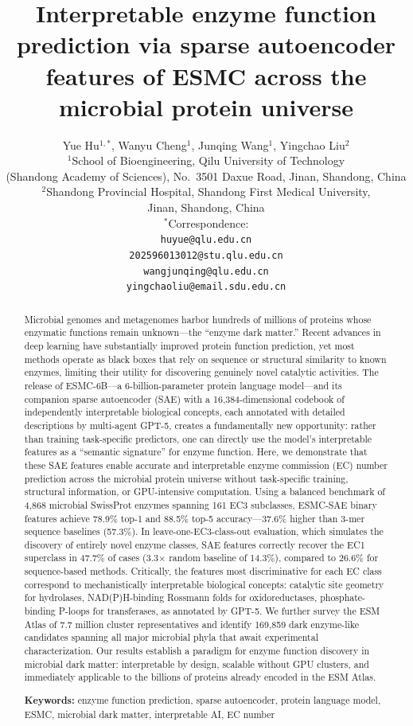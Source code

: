 \documentclass[12pt,a4paper]{article}
\title{\textbf{Interpretable enzyme function prediction via sparse autoencoder features of ESMC across the microbial protein universe}}
\author{
  \large
  Yue Hu$^{1,\ast}$, Wanyu Cheng$^{1}$, Junqing Wang$^{1}$, Yingchao Liu$^{2}$\\[6pt]
  \small
  $^{1}$School of Bioengineering, Qilu University of Technology\\
  \hspace*{1.2em}(Shandong Academy of Sciences), No.\ 3501 Daxue Road, Jinan, Shandong, China\\[4pt]
  $^{2}$Shandong Provincial Hospital, Shandong First Medical University,\\
  \hspace*{1.2em}Jinan, Shandong, China\\[8pt]
  $^{\ast}$Correspondence:\\
  \hspace*{1.2em}\texttt{huyue@qlu.edu.cn}\\
  \hspace*{1.2em}\texttt{202596013012@stu.qlu.edu.cn}\\
  \hspace*{1.2em}\texttt{wangjunqing@qlu.edu.cn}\\
  \hspace*{1.2em}\texttt{yingchaoliu@email.sdu.edu.cn}
}
\date{}
\begin{document}
\sloppy
\maketitle

\begin{abstract}
Microbial genomes and metagenomes harbor hundreds of millions of proteins whose enzymatic functions remain unknown---the ``enzyme dark matter.'' Recent advances in deep learning have substantially improved protein function prediction, yet most methods operate as black boxes that rely on sequence or structural similarity to known enzymes, limiting their utility for discovering genuinely novel catalytic activities. The release of ESMC-6B---a 6-billion-parameter protein language model---and its companion sparse autoencoder (SAE) with a 16,384-dimensional codebook of independently interpretable biological concepts, each annotated with detailed descriptions by multi-agent GPT-5, creates a fundamentally new opportunity: rather than training task-specific predictors, one can directly use the model's interpretable features as a ``semantic signature'' for enzyme function. Here, we demonstrate that these SAE features enable accurate and interpretable enzyme commission (EC) number prediction across the microbial protein universe without task-specific training, structural information, or GPU-intensive computation. Using a balanced benchmark of 4,868 microbial SwissProt enzymes spanning 161 EC3 subclasses, ESMC-SAE binary features achieve 78.9\% top-1 and 88.5\% top-5 accuracy---37.6\% higher than 3-mer sequence baselines (57.3\%). In leave-one-EC3-class-out evaluation, which simulates the discovery of entirely novel enzyme classes, SAE features correctly recover the EC1 superclass in 47.7\% of cases (3.3$\times$ random baseline of 14.3\%), compared to 26.6\% for sequence-based methods. Critically, the features most discriminative for each EC class correspond to mechanistically interpretable biological concepts: catalytic site geometry for hydrolases, NAD(P)H-binding Rossmann folds for oxidoreductases, phosphate-binding P-loops for transferases, as annotated by GPT-5. We further survey the ESM Atlas of 7.7 million cluster representatives and identify 169,859 dark enzyme-like candidates spanning all major microbial phyla that await experimental characterization. Our results establish a paradigm for enzyme function discovery in microbial dark matter: interpretable by design, scalable without GPU clusters, and immediately applicable to the billions of proteins already encoded in the ESM Atlas.

\textbf{Keywords:} enzyme function prediction, sparse autoencoder, protein language model, ESMC, microbial dark matter, interpretable AI, EC number
\end{abstract}
\end{document}
